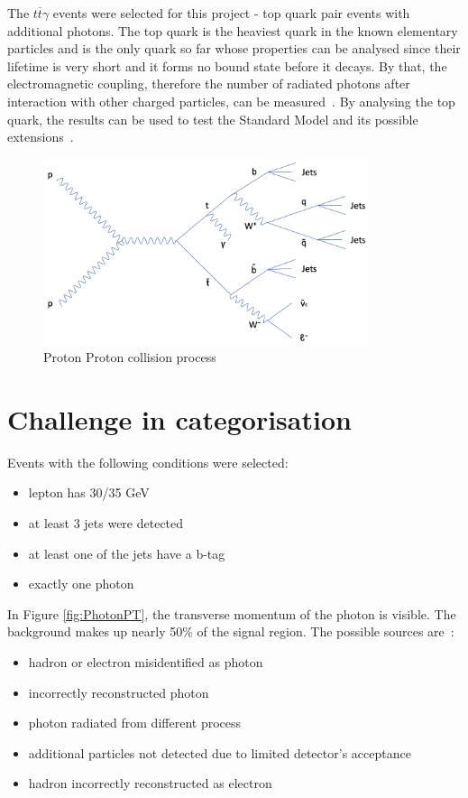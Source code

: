 \documentclass[11pt]{scrartcl}
\begin{document}
	The $t\overline{t}\gamma$ events were selected for this project - top quark pair events with additional photons. The top quark is the heaviest quark in the known elementary particles and is the only quark so far whose properties can be analysed since their lifetime is very short and it forms no bound state before it decays. By that, the electromagnetic coupling, therefore the number of radiated photons after interaction with other charged particles, can be measured~\cite{TTG}. By analysing the top quark, the results can be used to test the Standard Model and its possible extensions~\cite{ATLAS}.
	
	\begin{figure}[H]
	\centering
	\includegraphics[width=0.85\textwidth]{figures/PP_process.png}
	\caption{Proton Proton collision process}
 	\label{fig:PPprocess}
	\end{figure}
	
\section{Challenge in categorisation}

Events with the following conditions were selected: 

\begin{itemize}
  \item lepton has 30/35 GeV
  \item at least 3 jets were detected
  \item at least one of the jets have a b-tag
  \item exactly one photon
\end{itemize}

In Figure \ref{fig:PhotonPT}, the transverse momentum of the photon is visible. The background makes up nearly 50\% of the signal region. The possible sources are~\cite{TTG, ATLAS}:
\begin{itemize}
  \item hadron or electron misidentified as photon
  \item incorrectly reconstructed photon
  \item photon radiated from different process
  \item additional particles not detected due to limited detector's acceptance
  \item hadron incorrectly reconstructed as electron
\end{itemize}
\end{document}
